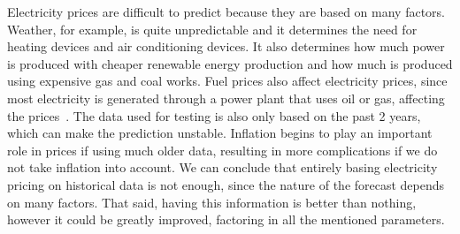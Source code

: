 Electricity prices are difficult to predict because they are based on many factors. Weather, for example, is quite unpredictable and it determines the need for heating devices and air conditioning devices. It also determines how much power is produced with cheaper renewable energy production and how much is produced using expensive gas and coal works. Fuel prices also affect electricity prices, since most electricity is generated through a power plant that uses oil or gas, affecting the prices~\cite{nordpoolSpotProducers}. The data used for testing is also only based on the past 2 years, which can make the prediction unstable. Inflation begins to play an important role in prices if using much older data, resulting in more complications if we do not take inflation into account. We can conclude that entirely basing electricity pricing on historical data is not enough, since the nature of the forecast depends on many factors. That said, having this information is better than nothing, however it could be greatly improved, factoring in all the mentioned parameters.
